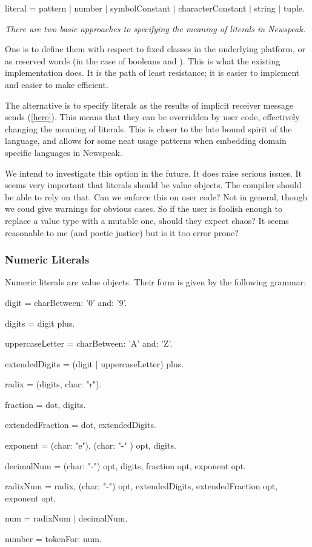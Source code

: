 \documentclass{article}
\begin{document}
\begin{newspeak}
literal =  pattern $|$ number $|$ symbolConstant $|$ characterConstant $|$ string $|$ tuple.
\end{newspeak}

{\it
There are two basic approaches to specifying the meaning of literals in Newspeak. 

One is to define them with respect to fixed classes in the underlying platform, or as reserved words (in the case of booleans and \NIL{}). This is what the existing implementation does. It is the path of least resistance; it is easier to implement and easier to make efficient.

The alternative is to specify literals as the results of implicit receiver message  sends (\ref{here}). This means that they can be overridden by user code, effectively changing the meaning of literals. This is closer to the late bound spirit of the language, and allows for some neat usage patterns when embedding domain specific languages in Newspeak.

We intend to investigate this option in the future. It does raise serious issues. It seems very important that literals should be value objects.  The compiler should be able to rely on that. Can we enforce this on user code? Not in general, though we coud give warnings for obvious cases. So if the user is foolish enough to replace a value type with a mutable one, should they expect chaos? It seems reasonable to me (and poetic justice) but is it too error prone?
}

\subsubsection{ Numeric Literals}
\label{number}

Numeric literals are value objects. Their form is given by the following grammar:
\begin{newspeak}
digit = charBetween: '0' and: '9'.

digits =  digit plus.

uppercaseLetter = charBetween: 'A' and: 'Z'.

extendedDigits = (digit $|$ uppercaseLetter) plus.

radix = (digits, char: "r").
                   
fraction =  dot, digits.

extendedFraction =  dot, extendedDigits.
                        
exponent = (char: "e"), (char: "-" ) opt, digits.

decimalNum = (char: "-")  opt, digits, fraction opt, exponent opt.

radixNum = radix,
               (char: "-")  opt,  
               extendedDigits, 
               extendedFraction opt,
               exponent opt.
                                                                                                                   
num =   radixNum $|$ decimalNum.
                                                                                                         
number =  tokenFor: num.
\end{newspeak}
\end{document}
